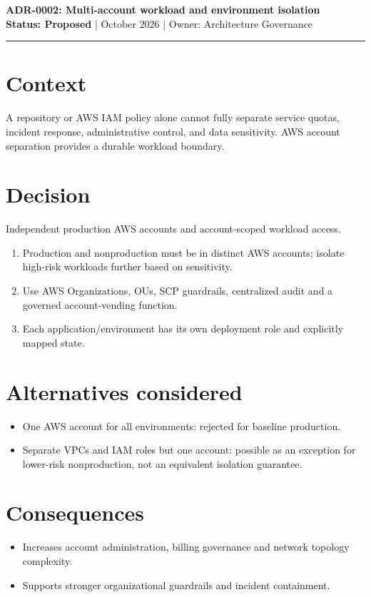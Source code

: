 \documentclass[11pt]{article}
\begin{document}
\begin{center}
{\LARGE\bfseries\color{Navy} ADR-0002: Multi-account workload and environment isolation }\\[4mm]
\textbf{Status: Proposed} \quad |  October 2026 \quad | \quad Owner: Architecture Governance
\end{center}
\hrule
\section*{Context}
A repository or AWS IAM policy alone cannot fully separate service quotas, incident response, administrative control, and data sensitivity. AWS account separation provides a durable workload boundary.
\section*{Decision}
Independent production AWS accounts and account-scoped workload access.
\begin{enumerate}[leftmargin=*]
\item Production and nonproduction must be in distinct AWS accounts; isolate high-risk workloads further based on sensitivity.
\item Use AWS Organizations, OUs, SCP guardrails, centralized audit and a governed account-vending function.
\item Each application/environment has its own deployment role and explicitly mapped state.
\end{enumerate}
\section*{Alternatives considered}
\begin{itemize}[leftmargin=*]
\item One AWS account for all environments: rejected for baseline production.
\item Separate VPCs and IAM roles but one account: possible as an exception for lower-risk nonproduction, not an equivalent isolation guarantee.
\end{itemize}
\section*{Consequences}
\begin{itemize}[leftmargin=*]
\item Increases account administration, billing governance and network topology complexity.
\item Supports stronger organizational guardrails and incident containment.
\end{itemize}
\end{document}
